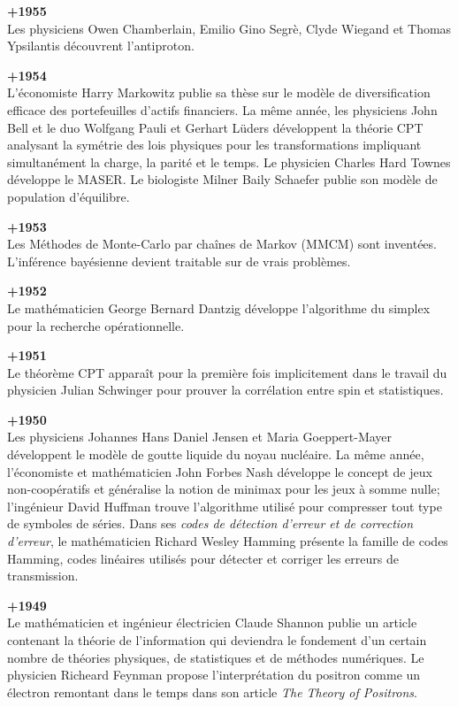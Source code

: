 \textbf{+1955}\\
Les physiciens Owen Chamberlain, Emilio Gino Segrè, Clyde Wiegand et Thomas Ypsilantis découvrent l'antiproton.

\textbf{+1954}\\
L'économiste Harry Markowitz publie sa thèse sur le modèle de diversification efficace des portefeuilles d'actifs financiers. La même année, les physiciens John Bell et le duo Wolfgang Pauli et Gerhart Lüders développent la théorie CPT analysant la symétrie des lois physiques pour les transformations impliquant simultanément la charge, la parité et le temps. Le physicien Charles Hard Townes développe le MASER. Le biologiste Milner Baily Schaefer publie son modèle de population d'équilibre.

\textbf{+1953}\\
Les Méthodes de Monte-Carlo par chaînes de Markov (MMCM) sont inventées. L'inférence bayésienne devient traitable sur de vrais problèmes.


\textbf{+1952}\\
Le mathématicien George Bernard Dantzig développe l'algorithme du simplex pour la recherche opérationnelle.

\textbf{+1951}\\
Le théorème CPT apparaît pour la première fois implicitement dans le travail du physicien Julian Schwinger pour prouver la corrélation entre spin et statistiques.

\textbf{+1950}\\
Les physiciens Johannes Hans Daniel Jensen et Maria Goeppert-Mayer développent le modèle de goutte liquide du noyau nucléaire. La même année, l'économiste et mathématicien John Forbes Nash développe le concept de jeux non-coopératifs et généralise la notion de minimax pour les jeux à somme nulle; l'ingénieur David Huffman trouve l'algorithme utilisé pour compresser tout type de symboles de séries. Dans ses \textit{codes de détection d'erreur et de correction d'erreur}, le mathématicien Richard Wesley Hamming présente la famille de codes Hamming, codes linéaires utilisés pour détecter et corriger les erreurs de transmission.

\textbf{+1949}\\
Le mathématicien et ingénieur électricien Claude Shannon publie un article contenant la théorie de l'information qui deviendra le fondement d'un certain nombre de théories physiques, de statistiques et de méthodes numériques. Le physicien Richeard Feynman propose l'interprétation du positron comme un électron remontant dans le temps dans son article \textit{The Theory of Positrons}.


